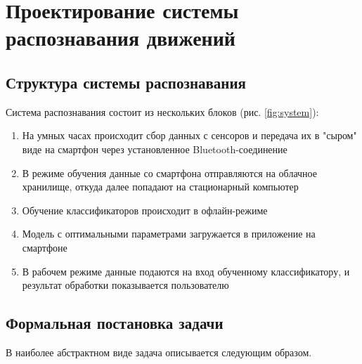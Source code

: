 \chapter{Проектирование системы распознавания движений}


\section{Структура системы распознавания}

Система распознавания состоит из нескольких блоков (рис. \ref{fig:system}):


\begin{enumerate}
\item На умных часах происходит сбор данных с сенсоров и передача их в "сыром" виде на смартфон через установленное Bluetooth-соединение
\item В режиме обучения данные со смартфона отправляются на облачное хранилище, откуда далее попадают на стационарный компьютер
\item Обучение классификаторов происходит в офлайн-режиме
\item Модель с оптимальными параметрами загружается в приложение на смартфоне
\item В рабочем режиме данные подаются на вход обученному классификатору, и результат обработки показывается пользователю
\end{enumerate}


\section{Формальная постановка задачи}


В наиболее абстрактном виде задача описывается следующим образом. 

